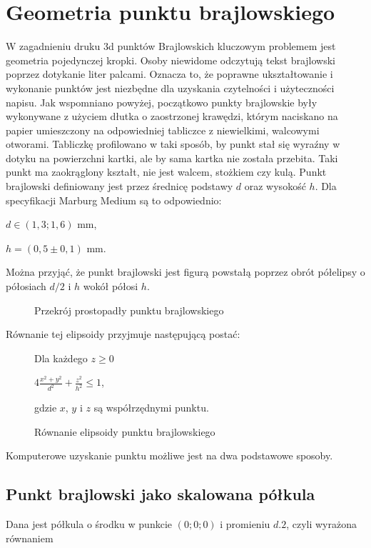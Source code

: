 \documentclass[12pt,a4paper]{article}
\begin{document}
\section{Geometria punktu brajlowskiego}
W zagadnieniu druku 3d punktów Brajlowskich kluczowym problemem jest geometria pojedynczej kropki. Osoby niewidome odczytują tekst brajlowski poprzez dotykanie liter palcami. Oznacza to, że poprawne ukształtowanie i wykonanie punktów jest niezbędne dla uzyskania czytelności i użyteczności napisu.
Jak wspomniano powyżej, początkowo punkty brajlowskie były wykonywane z użyciem dłutka o zaostrzonej krawędzi, którym  naciskano na papier umieszczony na odpowiedniej tabliczce z niewielkimi, walcowymi otworami. Tabliczkę profilowano w taki sposób, by punkt stał się wyraźny w dotyku na powierzchni kartki, ale by sama kartka nie została przebita.
Taki punkt ma zaokrąglony kształt, nie jest walcem, stożkiem czy kulą.
Punkt brajlowski definiowany jest przez średnicę podstawy $d$ oraz wysokość $h$. Dla specyfikacji Marburg Medium \cite{brailleiso} są to odpowiednio:

$d \in (1{,}3; 1{,}6) \text{ mm}$,

$h = (0{,}5 \pm 0{,}1) \text{ mm}$.

Można przyjąć, że punkt brajlowski jest figurą powstałą poprzez obrót półelipsy o półosiach $d/2$ i $h$ wokół półosi $h$.

\begin{figure}
\centering
{}
\caption{Przekrój prostopadły punktu brajlowskiego}
\end{figure}

Równanie tej elipsoidy przyjmuje następującą postać:
\begin{figure}
Dla każdego $z \geq 0$

$4\frac{x^2+y^2}{d^2} + \frac{z^2}{h^2} \leq 1$,

gdzie $x$, $y$ i $z$ są współrzędnymi punktu.
\caption{Równanie elipsoidy punktu brajlowskiego}
\end{figure}

Komputerowe uzyskanie punktu możliwe jest na dwa podstawowe sposoby.

\subsection{Punkt brajlowski jako skalowana półkula}
Dana jest półkula o środku w punkcie $(0;0;0)$ i promieniu $d.2$, czyli wyrażona równaniem
\end{document}
